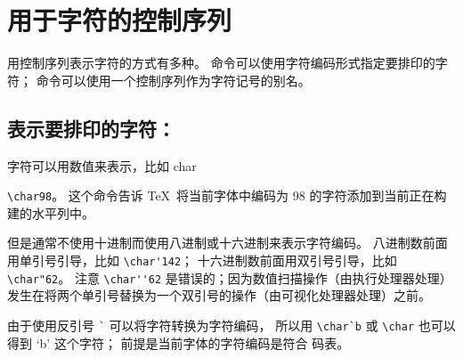 \documentclass{book}
\begin{document}
\section{用于字符的控制序列}

用控制序列表示字符的方式有多种。
 命令可以使用字符编码形式指定要排印的字符；
 命令可以使用一个控制序列作为字符记号的别名。

\subsection{表示要排印的字符：\protect{}}

字符可以用数值来表示，比如 \cstoidx char\par\verb-\char98-。
这个命令告诉 \TeX\ 将当前字体中编码为 98 的字符添加到当前正在构建的水平列中。

但是通常不使用十进制而使用八进制或十六进制来表示字符编码。
八进制数前面用单引号引导，比如 \verb.\char'142.；
十六进制数前面用双引号引导，比如 \verb.\char"62.。
注意 \verb.\char''62. 是错误的；因为数值扫描操作（由执行处理器处理）%
发生在将两个单引号替换为一个双引号的操作（由可视化处理器处理）之前。

由于使用反引号 \verb-`- 可以将字符转换为字符编码，
所以用 \verb-\char`b- 或 \verb-\char- 也可以得到 `b' 这个字符；
前提是当前字体的字符编码是符合 \ascii{} 码表。
\end{document}
